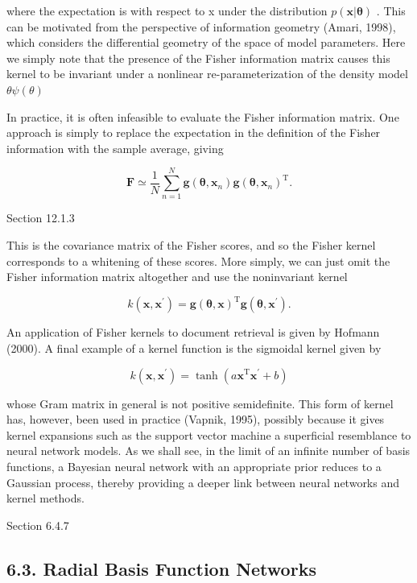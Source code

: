 \documentclass[
  10
]{article}
\begin{document}
where the expectation is with respect to x under the distribution
\(p ( \mathbf { x } | \mathbf { \boldsymbol { \theta } } )\) . This can
be motivated from the perspective of information geometry (Amari, 1998),
which considers the differential geometry of the space of model
parameters. Here we simply note that the presence of the Fisher
information matrix causes this kernel to be invariant under a nonlinear
re-parameterization of the density model \(\theta  \psi ( \theta )\)

In practice, it is often infeasible to evaluate the Fisher information
matrix. One approach is simply to replace the expectation in the
definition of the Fisher information with the sample average, giving

\[
\mathbf {F} \simeq \frac {1}{N} \sum_ {n = 1} ^ {N} \mathbf {g} (\boldsymbol {\theta}, \mathbf {x} _ {n}) \mathbf {g} (\boldsymbol {\theta}, \mathbf {x} _ {n}) ^ {\mathrm{T}}.\tag{6.35}
\]

Section 12.1.3

This is the covariance matrix of the Fisher scores, and so the Fisher
kernel corresponds to a whitening of these scores. More simply, we can
just omit the Fisher information matrix altogether and use the
noninvariant kernel

\[
k (\mathbf {x}, \mathbf {x} ^ {\prime}) = \mathbf {g} (\boldsymbol {\theta}, \mathbf {x}) ^ {\mathrm{T}} \mathbf {g} (\boldsymbol {\theta}, \mathbf {x} ^ {\prime}).\tag{6.36}
\]

An application of Fisher kernels to document retrieval is given by
Hofmann (2000). A final example of a kernel function is the sigmoidal
kernel given by

\[
k (\mathbf {x}, \mathbf {x} ^ {\prime}) = \tanh \left(a \mathbf {x} ^ {\mathrm{T}} \mathbf {x} ^ {\prime} + b\right)\tag{6.37}
\]

whose Gram matrix in general is not positive semidefinite. This form of
kernel has, however, been used in practice (Vapnik, 1995), possibly
because it gives kernel expansions such as the support vector machine a
superficial resemblance to neural network models. As we shall see, in
the limit of an infinite number of basis functions, a Bayesian neural
network with an appropriate prior reduces to a Gaussian process, thereby
providing a deeper link between neural networks and kernel methods.

Section 6.4.7

\subsection{6.3. Radial Basis Function
Networks}\label{radial-basis-function-networks}
\end{document}
